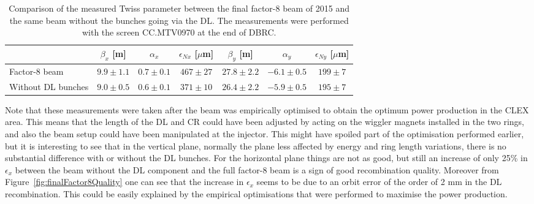 %
%
\begin{table}[bp]
\centering
\begin{tabular}{l c c c c c c}
\hline
                & $\beta_x$  [m]  &  $\alpha_x$     &  $\epsilon_{Nx}$   [$\mu$m]   & $\beta_y$  [m]  &  $\alpha_y$     &  $\epsilon_{Ny}$   [$\mu$m]    \\
\hline
Factor-8 beam            & $9.9 \pm 1.1$   & $0.7 \pm 0.1$   & $467 \pm 27$       & $27.8 \pm 2.2$   & $-6.1 \pm 0.5$   & $199 \pm 7$ \\
Without DL bunches          & $9.0 \pm 0.5$   & $0.6 \pm 0.1$   & $371 \pm 10$       & $26.4 \pm 2.2$   & $-5.9 \pm 0.5$   & $195 \pm 7$ \\
\hline 
\end{tabular}
\caption{Comparison of the measured Twiss parameter between the final factor-8 beam of 2015 and the same beam
         without the bunches going via the DL.
         The measurements were performed with the screen CC.MTV0970 at the end of DBRC.}
\label{tab:finalFactor8Quality}
\end{table}
%


Note that these measurements were taken after the beam was empirically optimised to obtain the optimum power
production in the CLEX area.
This means that the length of the DL and CR could have been adjusted by acting on the wiggler magnets
installed in the two rings, and also the beam setup could have been manipulated at the injector.
This might have spoiled part of the optimisation performed earlier, but it is interesting to see that in the
vertical plane, normally the plane less affected by energy and ring length variations, there is no
substantial difference with or without the DL bunches.
For the horizontal plane things are not as good, but still an increase of only 25\% in $\epsilon_x$ between
the beam without the DL component and the full factor-8 beam is a sign of good recombination quality.
Moreover from Figure~\ref{fig:finalFactor8Quality} one can see that the
increase in $\epsilon_x$ seems to be due to an orbit error of the order of 2 mm in the DL recombination.
This could be easily explained by the empirical optimisations that were performed to maximise the power
production.







